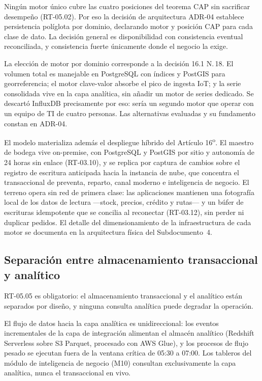 Ningún motor único cubre las cuatro posiciones del teorema CAP sin sacrificar
desempeño (RT-05.02).  Por eso la decisión de arquitectura ADR-04 establece
persistencia políglota por dominio, declarando motor y posición CAP para cada
clase de dato.  La decisión general es disponibilidad con consistencia eventual
reconciliada, y consistencia fuerte únicamente donde el negocio la exige.


La elección de motor por dominio corresponde a la decisión 16.1
N.\textdegree\,18.  El volumen total es manejable en PostgreSQL con índices y
PostGIS para georreferencia; el motor clave-valor absorbe el pico de ingesta
IoT; y la serie consolidada vive en la capa analítica, sin añadir un motor de
series dedicado.  Se descartó InfluxDB precisamente por eso: sería un segundo
motor que operar con un equipo de TI de cuatro personas.  Las alternativas
evaluadas y su fundamento constan en ADR-04.

El modelo materializa además el despliegue híbrido del Artículo
16\textsuperscript{o}.  El maestro de bodega vive on-premise, con PostgreSQL y
PostGIS por sitio y autonomía de 24 horas sin enlace (RT-03.10), y se replica
por captura de cambios sobre el registro de escritura anticipada hacia la
instancia de nube, que concentra el transaccional de preventa, reparto, canal
moderno e inteligencia de negocio.  El terreno opera sin red de primera clase:
las aplicaciones mantienen una fotografía local de los datos de lectura
---stock, precios, crédito y rutas--- y un búfer de escrituras idempotente que
se concilia al reconectar (RT-03.12), sin perder ni duplicar pedidos.  El
detalle del dimensionamiento de la infraestructura de cada motor se documenta
en la arquitectura física del Subdocumento~4.


\subsection{Separación entre almacenamiento transaccional y analítico}
\label{sec:separacion-oltp-olap}

RT-05.05 es obligatorio: el almacenamiento transaccional y el analítico están
separados por diseño, y ninguna consulta analítica puede degradar la operación.


El flujo de datos hacia la capa analítica es unidireccional: los eventos
incrementales de la capa de integración alimentan el almacén analítico
(Redshift Serverless sobre S3 Parquet, procesado con AWS Glue), y los procesos
de flujo pesado se ejecutan fuera de la ventana crítica de 05:30 a 07:00.
Los tableros del módulo de inteligencia de negocio (M10) consultan
exclusivamente la capa analítica, nunca el transaccional en vivo.

